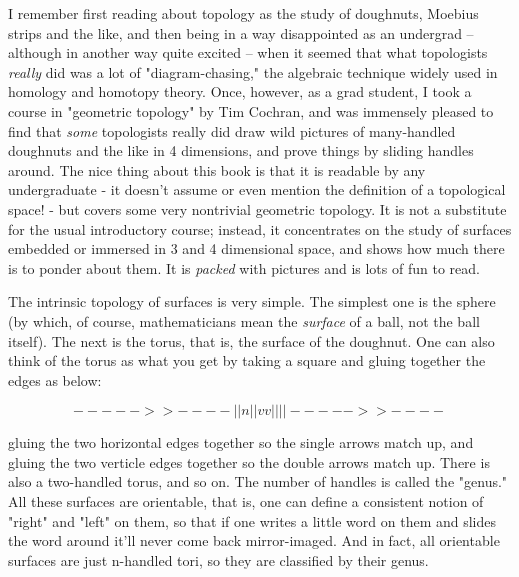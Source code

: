 I remember first reading about topology as the study of doughnuts,
Moebius strips and the like, and then being in a way disappointed as an
undergrad -- although in another way quite excited --  when it seemed
that what topologists \emph{really} did was a lot of "diagram-chasing," the
algebraic technique widely used in homology and homotopy theory.  Once,
however, as a grad student, I took a course in "geometric topology" by
Tim Cochran, and was immensely pleased to find that \emph{some} topologists
really did draw wild pictures of many-handled doughnuts and the like in
4 dimensions, and prove things by sliding handles around.  The nice
thing about this book is that it is readable by any undergraduate - it
doesn't assume or even mention the definition of a topological space! -
but covers some very nontrivial geometric topology.  It is not a
substitute for the usual introductory course; instead, it concentrates
on the study of surfaces embedded or immersed in 3 and 4 dimensional
space, and shows how much there is to ponder about them.  It is \emph{packed}
with pictures and is lots of fun to read.

The intrinsic topology of surfaces is very simple.  The simplest one is
the sphere (by which, of course, mathematicians mean the \emph{surface} of a
ball, not the ball itself).  The next is the torus, that is, the surface
of the doughnut.   One can also think of the torus as what you get by
taking a square and gluing together the edges as below:



$$

     ----->>----
    |           |n
    |           |  
    v           v
    |           |
    |           |
     ----->>----

$$
    

gluing the two horizontal edges together so the single arrows match up, and
gluing the two verticle edges together so the double arrows match up.
There is also a two-handled torus, and so on.  The number of handles is called
the "genus."   All these surfaces are orientable, that is, one can
define a consistent notion of "right" and "left" on them, so that if one
writes a little word on them and slides the word around it'll never come
back mirror-imaged.  And in fact, all orientable surfaces are just
n-handled tori, so they are classified by their genus.  

